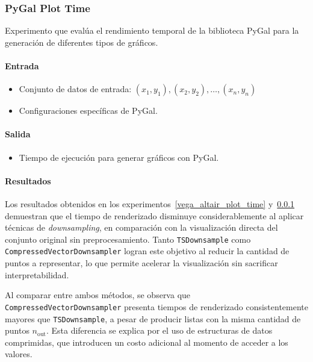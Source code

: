 \subsubsection{PyGal Plot Time}
\label{pygal_plot_time}

Experimento que evalúa el rendimiento temporal de la biblioteca PyGal para la generación de diferentes tipos de gráficos.

\paragraph{Entrada}
\begin{itemize}
    \item Conjunto de datos de entrada: \( (x_1, y_1), (x_2, y_2), \ldots, (x_n, y_n) \)
    \item Configuraciones específicas de PyGal.
\end{itemize}

\paragraph{Salida}
\begin{itemize}
    \item Tiempo de ejecución para generar gráficos con PyGal.
\end{itemize}

\newpage
\paragraph{Resultados}
\vspace{0.5em}
\noindent
\PyGalPlotTime
\newpage

Los resultados obtenidos en los experimentos~\ref{vega_altair_plot_time} y~\ref{pygal_plot_time} demuestran que el tiempo de renderizado disminuye considerablemente al aplicar técnicas de \textit{downsampling}, en comparación con la visualización directa del conjunto original sin preprocesamiento. Tanto \texttt{TSDownsample} como \texttt{CompressedVectorDownsampler} logran este objetivo al reducir la cantidad de puntos a representar, lo que permite acelerar la visualización sin sacrificar interpretabilidad.

Al comparar entre ambos métodos, se observa que \texttt{CompressedVectorDownsampler} presenta tiempos de renderizado consistentemente mayores que \texttt{TSDownsample}, a pesar de producir listas con la misma cantidad de puntos \(n_{\text{out}}\). Esta diferencia se explica por el uso de estructuras de datos comprimidas, que introducen un costo adicional al momento de acceder a los valores.

